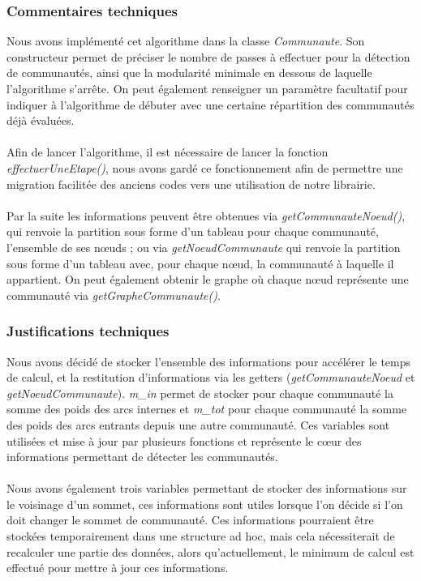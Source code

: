 \begin{titlepage}
{\subsubsection{Commentaires techniques}
{
Nous avons implémenté cet algorithme dans la classe \textit{Communaute}. Son constructeur permet de préciser le nombre de passes à effectuer pour la détection de communautés, ainsi que la modularité minimale en dessous de laquelle l'algorithme s'arrête. On peut également renseigner un paramètre facultatif pour indiquer à l'algorithme de débuter avec une certaine répartition des communautés déjà évaluées.
\\ \\ 
Afin de lancer l'algorithme, il est nécessaire de lancer la fonction \textit{effectuerUneEtape()}, nous avons gardé ce fonctionnement afin de permettre une migration facilitée des anciens codes vers une utilisation de notre librairie.
\\ \\ 
Par la suite les informations peuvent être obtenues via \textit{getCommunauteNoeud()}, qui renvoie la partition sous forme d'un tableau pour chaque communauté, l'ensemble de ses nœuds ; ou via \textit{getNoeudCommunaute} qui renvoie la partition sous forme d'un tableau avec, pour chaque nœud, la communauté à laquelle il appartient. On peut également obtenir le graphe où chaque nœud représente une communauté via \textit{getGrapheCommunaute()}.
}
\subsubsection{Justifications techniques}
{
Nous avons décidé de stocker l'ensemble des informations pour accélérer le temps de calcul, et la restitution d'informations via les getters (\textit{getCommunauteNoeud} et \textit{getNoeudCommunaute}). \textit{m\_in} permet de stocker pour chaque communauté la somme des poids des arcs internes et \textit{m\_tot} pour chaque communauté la somme des poids des arcs entrants depuis une autre communauté. Ces variables sont utilisées et mise à jour par plusieurs fonctions et représente le cœur des informations permettant de détecter les communautés.
\\ \\ 
Nous avons également trois variables permettant de stocker des informations sur le voisinage d'un sommet, ces informations sont utiles lorsque l'on décide si l'on doit changer le sommet de communauté. Ces informations pourraient être stockées temporairement dans une structure ad hoc, mais cela nécessiterait de recalculer une partie des données, alors qu'actuellement, le minimum de calcul est effectué pour mettre à jour ces informations.
}

}
\end{titlepage}
